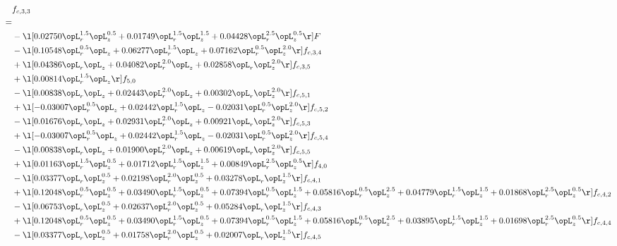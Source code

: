 \begin{alignat}{2} 
\label{eq:f_33_2} 
& f_{c,3,3} \nonumber \\ 
 = \\ 
& - \l[  0.02750 \opL_r^{1.5} \opL_z^{0.5} +  0.01749 \opL_r^{1.5} \opL_z^{1.5} +  0.04428 \opL_r^{2.5} \opL_z^{0.5}  \r] F \nonumber \\ 
& - \l[  0.10548 \opL_r^{0.5} \opL_z +  0.06277 \opL_r^{1.5} \opL_z +  0.07162 \opL_r^{0.5} \opL_z^{2.0}  \r] f_{c,3,4} \nonumber \\ 
& + \l[  0.04386 \opL_r \opL_z +  0.04082 \opL_r^{2.0} \opL_z +  0.02858 \opL_r \opL_z^{2.0}  \r] f_{c,3,5} \nonumber \\ 
& + \l[  0.00814 \opL_r^{1.5} \opL_z  \r] f_{5,0} \nonumber \\ 
& - \l[  0.00838 \opL_r \opL_z +  0.02443 \opL_r^{2.0} \opL_z +  0.00302 \opL_r \opL_z^{2.0}  \r] f_{c,5,1} \nonumber \\ 
& + \l[  -0.03007 \opL_r^{0.5} \opL_z +  0.02442 \opL_r^{1.5} \opL_z   -0.02031 \opL_r^{0.5} \opL_z^{2.0}  \r] f_{c,5,2} \nonumber \\ 
& - \l[  0.01676 \opL_r \opL_z +  0.02931 \opL_r^{2.0} \opL_z +  0.00921 \opL_r \opL_z^{2.0}  \r] f_{c,5,3} \nonumber \\ 
& + \l[  -0.03007 \opL_r^{0.5} \opL_z +  0.02442 \opL_r^{1.5} \opL_z   -0.02031 \opL_r^{0.5} \opL_z^{2.0}  \r] f_{c,5,4} \nonumber \\ 
& - \l[  0.00838 \opL_r \opL_z +  0.01900 \opL_r^{2.0} \opL_z +  0.00619 \opL_r \opL_z^{2.0}  \r] f_{c,5,5} \nonumber \\ 
& + \l[  0.01163 \opL_r^{1.5} \opL_z^{0.5} +  0.01712 \opL_r^{1.5} \opL_z^{1.5} +  0.00849 \opL_r^{2.5} \opL_z^{0.5}  \r] f_{4,0} \nonumber \\ 
& - \l[  0.03377 \opL_r \opL_z^{0.5} +  0.02198 \opL_r^{2.0} \opL_z^{0.5} +  0.03278 \opL_r \opL_z^{1.5}  \r] f_{c,4,1} \nonumber \\ 
& + \l[  0.12048 \opL_r^{0.5} \opL_z^{0.5} +  0.03490 \opL_r^{1.5} \opL_z^{0.5} +  0.07394 \opL_r^{0.5} \opL_z^{1.5} +  0.05816 \opL_r^{0.5} \opL_z^{2.5} +  0.04779 \opL_r^{1.5} \opL_z^{1.5} +  0.01868 \opL_r^{2.5} \opL_z^{0.5}  \r] f_{c,4,2} \nonumber \\ 
& - \l[  0.06753 \opL_r \opL_z^{0.5} +  0.02637 \opL_r^{2.0} \opL_z^{0.5} +  0.05284 \opL_r \opL_z^{1.5}  \r] f_{c,4,3} \nonumber \\ 
& + \l[  0.12048 \opL_r^{0.5} \opL_z^{0.5} +  0.03490 \opL_r^{1.5} \opL_z^{0.5} +  0.07394 \opL_r^{0.5} \opL_z^{1.5} +  0.05816 \opL_r^{0.5} \opL_z^{2.5} +  0.03895 \opL_r^{1.5} \opL_z^{1.5} +  0.01698 \opL_r^{2.5} \opL_z^{0.5}  \r] f_{c,4,4} \nonumber \\ 
& - \l[  0.03377 \opL_r \opL_z^{0.5} +  0.01758 \opL_r^{2.0} \opL_z^{0.5} +  0.02007 \opL_r \opL_z^{1.5}  \r] f_{c,4,5} \nonumber \\ 
\end{alignat} 


